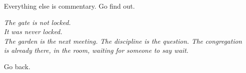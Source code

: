 Everything else is commentary. Go find out.

\vspace{2em}

\begin{center}
  \itshape The gate is not locked.\\
  It was never locked.\\[1em]
  The garden is the next meeting. The discipline is the question. The congregation is already there, in the room, waiting for someone to say wait.
\end{center}

\vspace{1.5em}
\begin{center}
  Go back.
\end{center}
